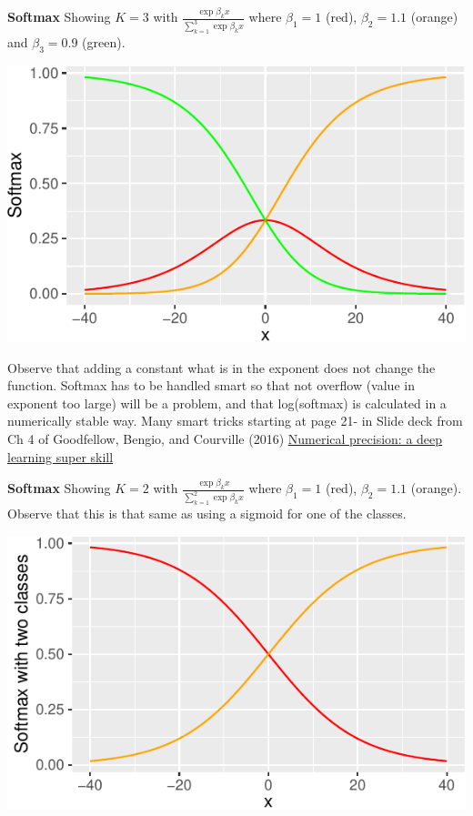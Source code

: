 \documentclass[
  ignorenonframetext,
]{beamer}
\begin{document}
\begin{frame}
\textbf{Softmax} Showing \(K=3\) with
\(\frac{\exp{\beta_k x}}{\sum_{k=1}^3 \exp{\beta_{k} x }}\) where
\(\beta_1=1\) (red), \(\beta_2=1.1\) (orange) and \(\beta_3=0.9\)
(green).

\includegraphics{L9_files/figure-beamer/unnamed-chunk-2-1.pdf}
\end{frame}

\begin{frame}
Observe that adding a constant what is in the exponent does not change
the function. Softmax has to be handled smart so that not overflow
(value in exponent too large) will be a problem, and that log(softmax)
is calculated in a numerically stable way. Many smart tricks starting at
page 21- in Slide deck from Ch 4 of Goodfellow, Bengio, and Courville
(2016)
\href{https://www.deeplearningbook.org/slides/04_numerical.pdf}{Numerical
precision: a deep learning super skill}
\end{frame}

\begin{frame}
\textbf{Softmax} Showing \(K=2\) with
\(\frac{\exp{\beta_k x}}{\sum_{k=1}^2 \exp{\beta_{k} x }}\) where
\(\beta_1=1\) (red), \(\beta_2=1.1\) (orange). Observe that this is that
same as using a sigmoid for one of the classes.

\includegraphics{L9_files/figure-beamer/unnamed-chunk-3-1.pdf}
\end{frame}
\end{document}
